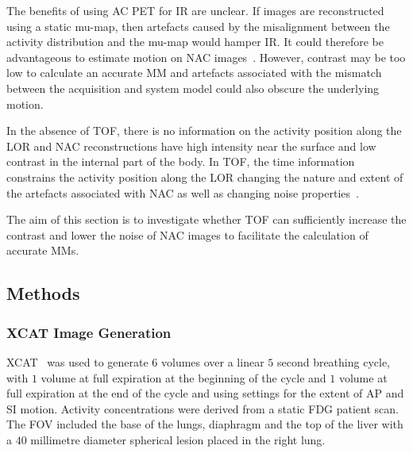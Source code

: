         The benefits of using \gls{AC} \gls{PET} for \gls{IR} are unclear. If images are reconstructed using a static \gls{mu-map}, then artefacts caused by the misalignment between the activity distribution and the \gls{mu-map} would hamper \gls{IR}. It could therefore be advantageous to estimate motion on \gls{NAC} images~. However, contrast may be too low to calculate an accurate \gls{MM} and artefacts associated with the mismatch between the acquisition and system model could also obscure the underlying motion. 
        
        In the absence of \gls{TOF}, there is no information on the activity position along the \gls{LOR} and \gls{NAC} reconstructions have high intensity near the surface and low contrast in the internal part of the body. In \gls{TOF}, the time information constrains the activity position along the \gls{LOR} changing the nature and extent of the artefacts associated with \gls{NAC} as well as changing noise properties~.
        
        The aim of this section is to investigate whether \gls{TOF} can sufficiently increase the contrast and lower the noise of \gls{NAC} images to facilitate the calculation of accurate \gls{MM}s.
        
        \subsection{Methods} \label{impact_of_tof_on_respiratory_motion_modelling_using_nac_pet_methods}
            \subsubsection{XCAT Image Generation} \label{impact_of_tof_on_respiratory_motion_modelling_using_nac_pet_methods_xcat_image_generation}
                \gls{XCAT}~ was used to generate $6$ volumes over a linear $5$ second breathing cycle, with $1$ volume at full expiration at the beginning of the cycle and $1$ volume at full expiration at the end of the cycle and using settings for the extent of \gls{AP} and \gls{SI} motion. Activity concentrations were derived from a static \gls{FDG} patient scan. The \gls{FOV} included the base of the lungs, diaphragm and the top of the liver with a $40$ millimetre diameter spherical lesion placed in the right lung.
            
